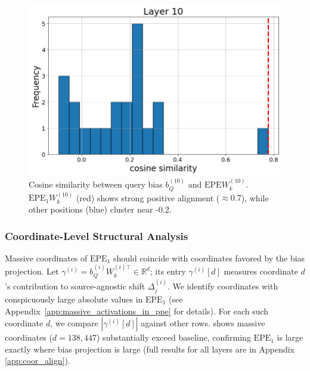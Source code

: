 \documentclass[11pt]{article}
\begin{document}
\begin{figure}[t]
  \includegraphics[width=\columnwidth]{figures/obs2_layer10.png}
  \caption{Cosine similarity between query bias $b_Q^{(10)}$ and $\mathrm{EPE}W_k^{(10)}$. $\mathrm{EPE}_1W_k^{(10)}$ (red) shows strong positive alignment ($\approx 0.7$), while other positions (blue) cluster near -0.2.}
  \label{fig:obs2_layer10}
\end{figure}

\subsubsection{Coordinate-Level Structural Analysis}
\label{sec:wk_structure}
Massive coordinates of $\mathrm{EPE}_1$ should coincide with coordinates favored by the bias projection. Let $\gamma^{(i)}=b_Q^{(i)}W_k^{(i)\top}\in\mathbb{R}^d$; its entry $\gamma^{(i)}[d]$ measures coordinate $d$'s contribution to source-agnostic shift $\Delta_j^{(i)}$. We identify coordinates with conspicuously large absolute values in 
$\mathrm{EPE}_1$ (see Appendix~\ref{app:massive_activations_in_ppe} for 
details). For each such coordinate $d$, we compare $|\gamma^{(i)}[d]|$ against other rows.  shows massive coordinates ($d{=}138,447$) substantially exceed baseline, confirming $\mathrm{EPE}_1$ is large exactly where bias projection is large (full results for all layers are in Appendix \ref{app:coor_align}).
\end{document}
